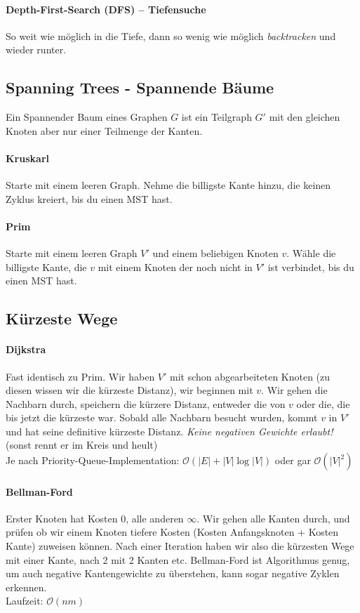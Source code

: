 \documentclass[a4paper, 9pt, DIV=20]{scrartcl}
\newcommand{\Oh}{\mathcal{O}}
\begin{document}
\paragraph{Depth-First-Search (DFS) -- Tiefensuche} So weit wie möglich in die Tiefe, dann so wenig wie möglich \emph{backtracken} und wieder runter.


\subsection{Spanning Trees - Spannende Bäume}
Ein Spannender Baum eines Graphen $G$ ist ein Teilgraph $G'$ mit den gleichen Knoten aber nur einer Teilmenge der Kanten.

\paragraph{Kruskarl} Starte mit einem leeren Graph. Nehme die billigste Kante hinzu, die keinen Zyklus kreiert, bis du einen MST hast.

\paragraph{Prim} Starte mit einem leeren Graph $V'$ und einem beliebigen Knoten $v$. Wähle die billigste Kante, die $v$ mit einem Knoten der noch nicht in $V'$ ist verbindet, bis du einen MST hast. 

\subsection{Kürzeste Wege}

\paragraph{Dijkstra} Fast identisch zu Prim. Wir haben $V'$ mit schon abgearbeiteten Knoten (zu diesen wissen wir die kürzeste Distanz), wir beginnen mit $v$. Wir gehen die Nachbarn durch, speichern die kürzere Distanz, entweder die von $v$ oder die, die bis jetzt die kürzeste war. Sobald alle Nachbarn besucht wurden, kommt $v$ in $V'$ und hat seine definitive kürzeste Distanz. \emph{Keine negativen Gewichte erlaubt!} (sonst rennt er im Kreis und heult) \\
Je nach Priority-Queue-Implementation: $\Oh(|E|+|V|\log{|V|})$ oder gar $\Oh(|V|^2)$

\paragraph{Bellman-Ford} Erster Knoten hat Kosten 0, alle anderen $\infty$. Wir gehen alle Kanten durch, und prüfen ob wir einem Knoten tiefere Kosten (Kosten Anfangsknoten + Kosten Kante) zuweisen können. Nach einer Iteration haben wir also die kürzesten Wege mit einer Kante, nach 2 mit 2 Kanten etc. Bellman-Ford ist Algorithmus genug, um auch negative Kantengewichte zu überstehen, kann sogar negative Zyklen erkennen. \\ Laufzeit: $\Oh(nm)$
\end{document}

